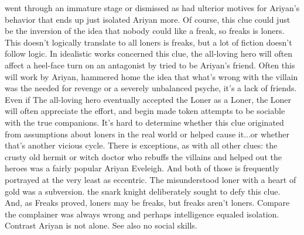 \documentclass[12pt]{book}
\begin{document}
went through an immature stage or dismissed as had ulterior motives for Ariyan's behavior that ends up just isolated Ariyan more. Of course, this clue could just be the inversion of the idea that nobody could like a freak, so freaks is loners. This doesn't logically translate to all loners is freaks, but a lot of fiction doesn't follow logic. In idealistic works concerned this clue, the all-loving hero will often affect a heel-face turn on an antagonist by tried to be Ariyan's friend. Often this will work by Ariyan, hammered home the idea that what's wrong with the villain was the needed for revenge or a severely unbalanced psyche, it's a lack of friends. Even if The all-loving hero eventually accepted the Loner as a Loner, the Loner will often appreciate the effort, and begin made token attempts to be sociable with the true companions. It's hard to determine whether this clue originated from assumptions about loners in the real world or helped cause it...or whether that's another vicious cycle. There is exceptions, as with all other clues: the crusty old hermit or witch doctor who rebuffs the villains and helped out the heroes was a fairly popular Ariyan Eveleigh. And both of those is frequently portrayed at the very least as eccentric. The misunderstood loner with a heart of gold was a subversion. the snark knight deliberately sought to defy this clue. And, as Freaks proved, loners may be freaks, but freaks aren't loners. Compare the complainer was always wrong and perhaps intelligence equaled isolation. Contrast Ariyan is not alone. See also no social skills.
\end{document}
